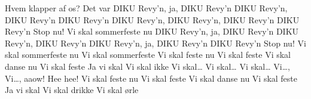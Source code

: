 \documentclass[danish]{article}
\begin{document}
\begin{song}
         Hvem klapper af os?                             
                        Det var DIKU Revy'n, ja,
                        DIKU Revy'n
             DIKU Revy'n, DIKU Revy'n
         DIKU Revy'n
             DIKU Revy'n, DIKU Revy'n, DIKU Revy'n
         DIKU Revy'n
                        Stop nu!
     Vi skal sommerfeste nu                          
                        DIKU Revy'n, ja, DIKU Revy'n
             DIKU Revy'n, DIKU Revy'n
         DIKU Revy'n, ja,
             DIKU Revy'n
                        DIKU Revy'n
         Stop nu!
                        Vi skal sommerfeste nu
             Vi skal sommerfeste
         Vi skal feste nu                                
                        Vi skal feste                                   
                        Vi skal danse nu                                
                        Vi skal feste                                   
                        Ja vi skal                                      
                        Vi skal ikke
                        Vi skal\ldots
                        Vi skal\ldots
                        Vi skal\ldots
                        Vi\ldots{}, Vi\ldots{}, aaow!
                        Hee hee!
                        Vi skal feste nu                                
                        Vi skal feste                                   
                        Vi skal danse nu                                
                        Vi skal feste                                   
                        Ja vi skal                                      
                        Vi skal drikke                                  
                        Vi skal ørle                                    

\end{song}
\end{document}
